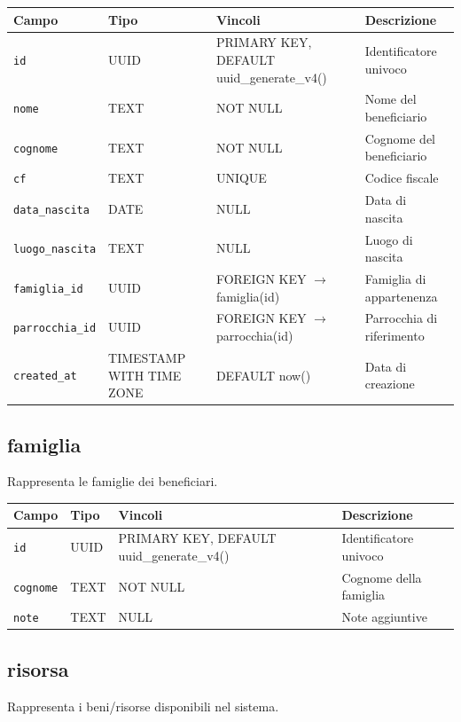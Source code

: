 \documentclass[11pt,a4paper]{article}
\begin{document}
\begin{longtable}{p{3cm}p{3cm}p{4cm}p{5cm}}
\toprule
\textbf{Campo} & \textbf{Tipo} & \textbf{Vincoli} & \textbf{Descrizione} \\
\midrule
\texttt{id} & UUID & PRIMARY KEY, DEFAULT uuid\_generate\_v4() & Identificatore univoco \\
\texttt{nome} & TEXT & NOT NULL & Nome del beneficiario \\
\texttt{cognome} & TEXT & NOT NULL & Cognome del beneficiario \\
\texttt{cf} & TEXT & UNIQUE & Codice fiscale \\
\texttt{data\_nascita} & DATE & NULL & Data di nascita \\
\texttt{luogo\_nascita} & TEXT & NULL & Luogo di nascita \\
\texttt{famiglia\_id} & UUID & FOREIGN KEY $\rightarrow$ famiglia(id) & Famiglia di appartenenza \\
\texttt{parrocchia\_id} & UUID & FOREIGN KEY $\rightarrow$ parrocchia(id) & Parrocchia di riferimento \\
\texttt{created\_at} & TIMESTAMP WITH TIME ZONE & DEFAULT now() & Data di creazione \\
\end{longtable}

\subsection{famiglia}
Rappresenta le famiglie dei beneficiari.

\begin{longtable}{p{3cm}p{3cm}p{4cm}p{5cm}}
\toprule
\textbf{Campo} & \textbf{Tipo} & \textbf{Vincoli} & \textbf{Descrizione} \\
\midrule
\texttt{id} & UUID & PRIMARY KEY, DEFAULT uuid\_generate\_v4() & Identificatore univoco \\
\texttt{cognome} & TEXT & NOT NULL & Cognome della famiglia \\
\texttt{note} & TEXT & NULL & Note aggiuntive \\
\end{longtable}

\subsection{risorsa}
Rappresenta i beni/risorse disponibili nel sistema.
\end{document}
